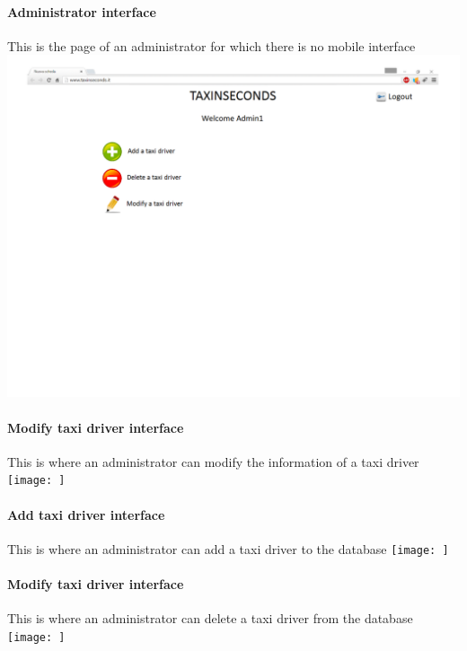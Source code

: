 \documentclass{article}
\begin{document}
\paragraph{Administrator interface}
This is the page of an administrator for which there is no mobile interface
\includegraphics{administrator interface}
\clearpage
\paragraph{Modify taxi driver interface} %
This is where an administrator can modify the information of a taxi driver
\texttt{[image: ]}
\clearpage
\paragraph{Add taxi driver interface} %
This is where an administrator can add a taxi driver to the database
\texttt{[image: ]}
\clearpage
\paragraph{Modify taxi driver interface} %
This is where an administrator can delete a taxi driver from the database
\texttt{[image: ]}
\clearpage
\end{document}

